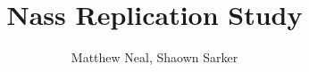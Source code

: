 \documentclass[english]{article}
\begin{document}
\title{Nass Replication Study}
\author{Matthew Neal, Shaown Sarker}
\maketitle
\end{document}
